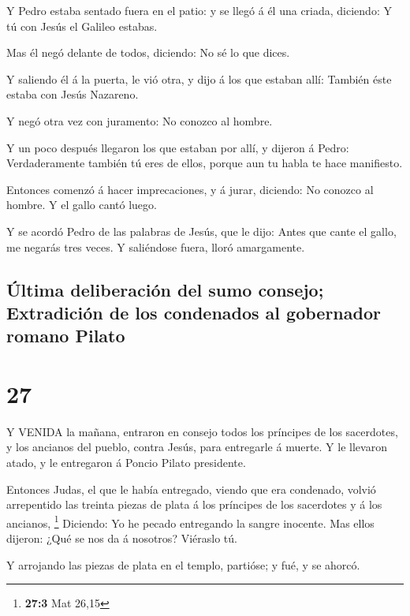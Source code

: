  Y Pedro estaba sentado fuera en el patio: y se llegó á él
una criada, diciendo: Y tú con Jesús el Galileo estabas.

 Mas él negó delante de todos, diciendo: No sé lo que
dices.

 Y saliendo él á la puerta, le vió otra, y dijo á los que
estaban allí: También éste estaba con Jesús Nazareno.

 Y negó otra vez con juramento: No conozco al hombre.

 Y un poco después llegaron los que estaban por allí, y
dijeron á Pedro: Verdaderamente también tú eres de ellos, porque aun tu
habla te hace manifiesto.

 Entonces comenzó á hacer imprecaciones, y á jurar,
diciendo: No conozco al hombre. Y el gallo cantó luego.

 Y se acordó Pedro de las palabras de Jesús, que le dijo:
Antes que cante el gallo, me negarás tres veces. Y saliéndose fuera,
lloró amargamente.

\hypertarget{uxfaltima-deliberaciuxf3n-del-sumo-consejo-extradiciuxf3n-de-los-condenados-al-gobernador-romano-pilato}{%
\subsection{Última deliberación del sumo consejo; Extradición de los
condenados al gobernador romano
Pilato}\label{uxfaltima-deliberaciuxf3n-del-sumo-consejo-extradiciuxf3n-de-los-condenados-al-gobernador-romano-pilato}}

\hypertarget{section-26}{%
\section{27}\label{section-26}}

 Y VENIDA la mañana, entraron en consejo todos los príncipes
de los sacerdotes, y los ancianos del pueblo, contra Jesús, para
entregarle á muerte.  Y le llevaron atado, y le entregaron á
Poncio Pilato presidente.

 Entonces Judas, el que le había entregado, viendo que era
condenado, volvió arrepentido las treinta piezas de plata á los
príncipes de los sacerdotes y á los ancianos, \footnote{\textbf{27:3}
  Mat 26,15}  Diciendo: Yo he pecado entregando la sangre
inocente. Mas ellos dijeron: ¿Qué se nos da á nosotros? Viéraslo tú.

 Y arrojando las piezas de plata en el templo, partióse; y
fué, y se ahorcó.

